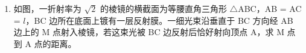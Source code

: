 \documentclass[\gkver]{gaokaozhenti}
\begin{document}
\begin{enumerate}
{【详解】由题意可知做出光路图如图所示

光线垂直于 BC 方向射入，根据几何关系可知入射角为  $45^\circ$；由于棱镜折射率为 2，根据  $n = \frac{\sin i}{\sin r}$

有

 $\sin r = \frac{1}{2}$

则折射角为  $30^\circ$； $\angle BMO = 60^\circ$，因为  $\angle B = 45^\circ$，所以光在 BC 面的入射角为

 $\theta = 90^\circ - \left(180^\circ - 60^\circ - 45^\circ\right) = 15^\circ$

根据反射定律可知

 $\angle MOA = 2\theta = 30^\circ$

根据几何关系可知  $\angle BAO = 30^\circ$，即  $\Delta MAO$ 为等腰三角形，则

 $\frac{MO}{AO} = \frac{\sqrt{3}}{3}$

又因为  $\Delta BOM$ 与  $\Delta CAO$ 相似，故有

 $\frac{BM}{AC} = \frac{MO}{AO}$

由题知  $AB = AC = l$

联立可得  $BM = \frac{\sqrt{3}}{3} AC = \frac{\sqrt{3}}{3} l$

所以 M 到 A 点的距离为

 $x = MA = l - BM = \frac{3 - \sqrt{3}}{3} l$
}

\item
如图，一折射率为 $\sqrt 2 $ 的棱镜的横截面为等腰直角三角形 $\triangle$ABC，AB = AC = $l$，BC 边所在底面上镀有一层反射膜。一细光束沿垂直于 BC 方向经 AB 边上的 M 点射入棱镜，若这束光被 BC 边反射后恰好射向顶点 A，求 M 点到 A 点的距离。

\end{enumerate}
\end{document}
